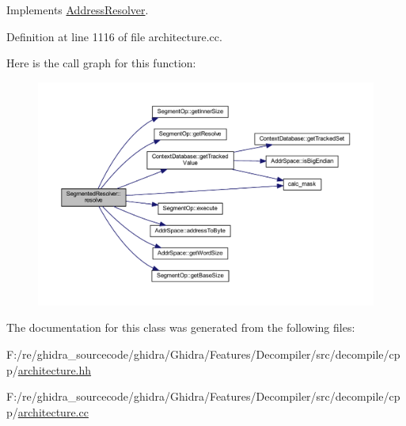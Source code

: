 Implements \mbox{\hyperlink{class_address_resolver_a5ac794d1a7c5c8c678ac5fecdf0499ff}{Address\+Resolver}}.



Definition at line 1116 of file architecture.\+cc.

Here is the call graph for this function\+:
\nopagebreak
\begin{figure}[H]
\begin{center}
\leavevmode
\includegraphics[width=350pt]{class_segmented_resolver_aba359676c120311d4f388dd814296db7_cgraph}
\end{center}
\end{figure}


The documentation for this class was generated from the following files\+:\begin{DoxyCompactItemize}
\item 
F\+:/re/ghidra\+\_\+sourcecode/ghidra/\+Ghidra/\+Features/\+Decompiler/src/decompile/cpp/\mbox{\hyperlink{architecture_8hh}{architecture.\+hh}}\item 
F\+:/re/ghidra\+\_\+sourcecode/ghidra/\+Ghidra/\+Features/\+Decompiler/src/decompile/cpp/\mbox{\hyperlink{architecture_8cc}{architecture.\+cc}}\end{DoxyCompactItemize}

